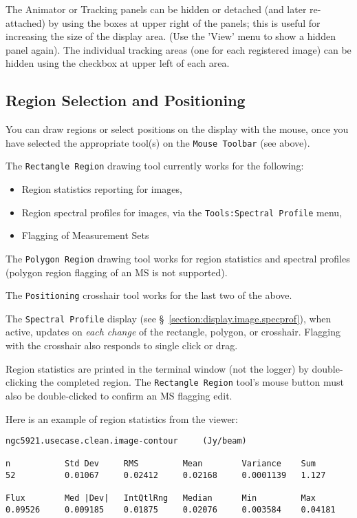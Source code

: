 The Animator or Tracking panels can be hidden or detached (and later
re-attached) by using the boxes at upper right of the panels; this is
useful for increasing the size of the display area.  (Use the 'View'
menu to show a hidden panel again).  The individual tracking areas
(one for each registered image) can be hidden using the checkbox at
upper left of each area.


\subsection{Region Selection and Positioning}
\label{section:display.viewerGUI.displaypanel.region}

You can draw regions or select positions on the display with the mouse,
once you have selected the appropriate tool(s) on the {\tt Mouse Toolbar}
(see above).

The {\tt Rectangle Region} drawing tool currently works for the following: 
\begin{itemize}
  \item Region statistics reporting for images,
  \item Region spectral profiles for images, via the
        {\tt Tools:Spectral Profile} menu,
  \item Flagging of Measurement Sets
\end{itemize}

The {\tt Polygon Region} drawing tool works for region statistics and
spectral profiles (polygon region flagging of an MS is not supported).

The {\tt Positioning} crosshair tool works for the last two of the above.

The {\tt Spectral Profile} display
(see \S~\ref{section:display.image.specprof}), when active, updates on
{\em each change} of the rectangle, polygon, or crosshair.  
Flagging with the crosshair also responds to single click or drag.

Region statistics are printed in the terminal window (not the logger)
by double-clicking the completed region.  The {\tt Rectangle Region}
tool's mouse button must also be double-clicked to confirm an MS
flagging edit.

Here is an example of region statistics from the viewer:
\small
\begin{verbatim}
ngc5921.usecase.clean.image-contour     (Jy/beam)

n           Std Dev     RMS         Mean        Variance    Sum
52          0.01067     0.02412     0.02168     0.0001139   1.127     

Flux        Med |Dev|   IntQtlRng   Median      Min         Max
0.09526     0.009185    0.01875     0.02076     0.003584    0.04181   
\end{verbatim}
\normalsize

